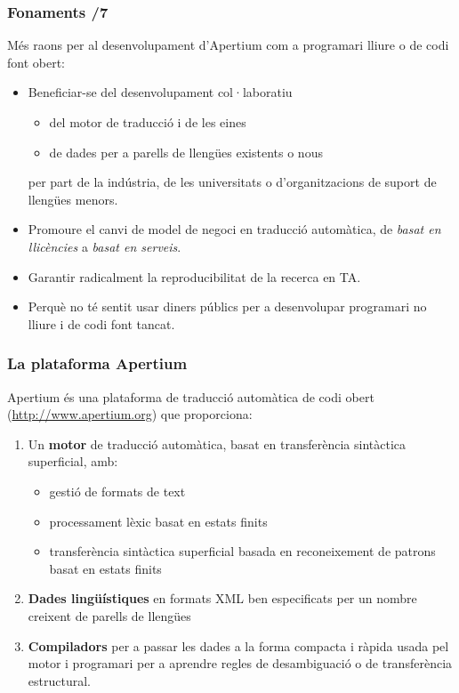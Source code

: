 \documentclass{beamer}
\newcommand{\empha}[1]{\emph{#1}\/}
\begin{document}
\begin{frame}
  \frametitle{Fonaments /7}
  
  Més raons per al desenvolupament d'Apertium com a programari lliure
  o de codi font obert:

\begin{itemize}
\item Beneficiar-se del desenvolupament col·laboratiu 
  \begin{itemize}
  \item del motor de traducció i de les eines
  \item de dades per a parells de llengües existents o nous
  \end{itemize}
per part de la indústria, de les universitats o d'organitzacions de suport de llengües menors.
\item Promoure el canvi de model de negoci en traducció automàtica,
  de \empha{basat en llicències} a \empha{basat en serveis}.
\item Garantir radicalment la reproducibilitat de la recerca en TA.
\item Perquè no té sentit usar diners públics per a desenvolupar
  programari no lliure i de codi font tancat.
\end{itemize}

\end{frame}

\begin{frame}
  \frametitle{La plataforma Apertium} 
Apertium és una plataforma de traducció automàtica de codi obert (\url{http://www.apertium.org}) que proporciona:
\begin{enumerate}
\item Un \textbf{motor} de traducció automàtica, basat en transferència sintàctica superficial, amb:
  \begin{itemize}
  \item gestió de formats de text
  \item processament lèxic basat en estats finits
  \item transferència sintàctica superficial basada en reconeixement de patrons basat en estats finits
  \end{itemize}
\item \textbf{Dades lingüístiques} en formats XML ben especificats per un nombre creixent de parells de llengües
\item \textbf{Compiladors} per a passar les dades a la forma compacta i ràpida usada pel motor i programari per a aprendre regles de desambiguació o de transferència estructural.
\end{enumerate}
\end{frame}
\end{document}
